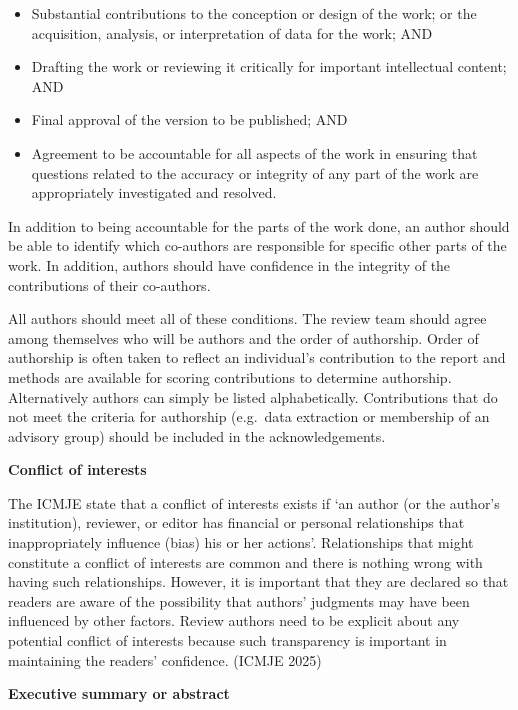 \documentclass[
  11pt,
  a4paper,
  DIV=11,
  numbers=noendperiod]{scrreprt}
\begin{document}
\begin{itemize}
\item
  Substantial contributions to the conception or design of the work; or
  the acquisition, analysis, or interpretation of data for the work; AND
\item
  Drafting the work or reviewing it critically for important
  intellectual content; AND
\item
  Final approval of the version to be published; AND
\item
  Agreement to be accountable for all aspects of the work in ensuring
  that questions related to the accuracy or integrity of any part of the
  work are appropriately investigated and resolved.
\end{itemize}

In addition to being accountable for the parts of the work done, an
author should be able to identify which co-authors are responsible for
specific other parts of the work. In addition, authors should have
confidence in the integrity of the contributions of their co-authors.

All authors should meet all of these conditions. The review team should
agree among themselves who will be authors and the order of authorship.
Order of authorship is often taken to reflect an individual's
contribution to the report and methods are available for scoring
contributions to determine authorship. Alternatively authors can simply
be listed alphabetically. Contributions that do not meet the criteria
for authorship (e.g.~data extraction or membership of an advisory group)
should be included in the acknowledgements.

\textbf{Conflict of interests}

The ICMJE state that a conflict of interests exists if `an author (or
the author's institution), reviewer, or editor has financial or personal
relationships that inappropriately influence (bias) his or her actions'.
Relationships that might constitute a conflict of interests are common
and there is nothing wrong with having such relationships. However, it
is important that they are declared so that readers are aware of the
possibility that authors' judgments may have been influenced by other
factors. Review authors need to be explicit about any potential conflict
of interests because such transparency is important in maintaining the
readers' confidence. (ICMJE 2025)

\textbf{Executive summary or abstract}
\end{document}

